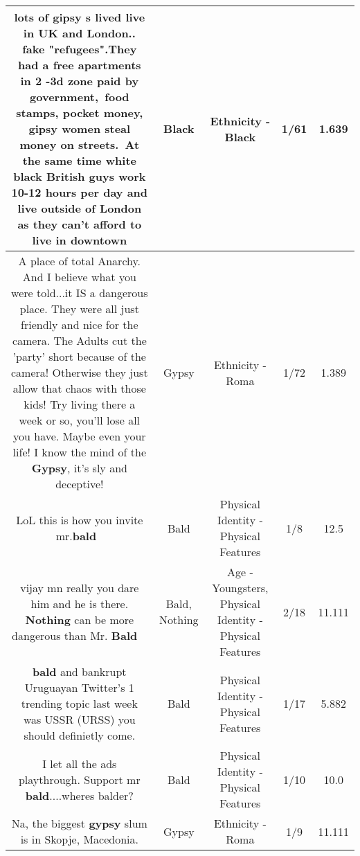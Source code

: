 \documentclass[11pt]{article}
\newlength\mylength
\begin{document}
\begin{center}
\begin{longtable}{|C{.65\mylength}|C{.30\mylength}|C{.12\mylength}|C{.12\mylength}|C{.12\mylength}|}
  \small lots of gipsy s lived  live in UK and London.. fake "refugees".They had a free apartments in 2 -3d zone paid by government, food stamps, pocket money, gipsy women steal money on streets. At the same time white  \textbf{black} British guys work 10-12 hours per day and live outside of London as they can't afford to live in downtown\normalsize   & Black & Ethnicity - Black & 1/61 & 1.639 \\  \hline
  \small A place of total Anarchy. And I believe what you were told...it IS a dangerous place. They were all just friendly and nice for the camera. The Adults cut the 'party' short because of the camera!  Otherwise they just allow that chaos with those kids! Try living there a week or so, you'll lose all you have. Maybe even your life! I know the mind of the \textbf{Gypsy}, it's sly and deceptive!\normalsize   & Gypsy & Ethnicity - Roma & 1/72 & 1.389 \\  \hline
  \small LoL this is how you invite mr.\textbf{bald} 🤣\normalsize   & Bald & Physical Identity - Physical Features & 1/8 & 12.5 \\  \hline
  \small vijay mn really you dare him and he is there. \textbf{Nothing} can be more dangerous than Mr. \textbf{Bald} 👨‍🦲\normalsize   & Bald, Nothing & Age - Youngsters, Physical Identity - Physical Features & 2/18 & 11.111 \\  \hline
  \small \@\textbf{bald} and bankrupt Uruguayan Twitter's  1 trending topic last week was USSR (URSS) you should definietly come.\normalsize   & Bald & Physical Identity - Physical Features & 1/17 & 5.882 \\  \hline
  \small I let all the ads playthrough. Support mr \textbf{bald}....wheres balder?\normalsize   & Bald & Physical Identity - Physical Features & 1/10 & 10.0 \\  \hline
  \small Na, the biggest \textbf{gypsy} slum is in Skopje, Macedonia.\normalsize   & Gypsy & Ethnicity - Roma & 1/9 & 11.111 \\  \hline

\end{longtable}
\end{center}
\end{document}
